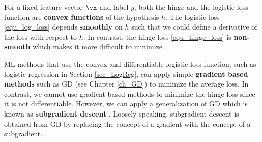 \documentclass[12pt]{report}
\begin{document}
For a fixed feature vector $\vx$ and label $y$, both the hinge 
and the logistic loss function are {\bf convex functions} of 
the hypothesis $h$. The logistic loss \eqref{equ_log_loss} 
depends {\bf smoothly} on $h$ such that we could define a derivative 
of the loss with respect to $h$. In contrast, the hinge loss 
\eqref{equ_hinge_loss} is {\bf non-smooth} which makes it 
more difficult to minimize. 

ML methods that use the convex and differentiable logistic loss function, 
such as logistic regression in Section \ref{sec_LogReg}, can 
apply simple {\bf gradient based methods} such as GD (see Chapter \ref{ch_GD}) 
to minimize the average loss. In contrast, 
we cannot use gradient based methods to minimize the hinge loss since 
it is not differentiable. However, we can apply a generalization of 
GD which is known as {\bf subgradient descent} \cite{CvxBubeck2015}. 
Loosely speaking, subgradient descent is obtained from GD 
by replacing the concept of a gradient with the concept 
of a subgradient. 
\end{document}
